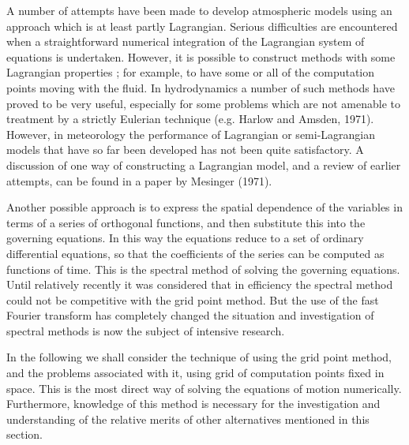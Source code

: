 A number of attempts have been made to develop atmospheric models using an approach which is at least partly Lagrangian. Serious difficulties are encountered when a straightforward numerical integration of the Lagrangian system of equations is undertaken. However, it is possible to construct methods with some Lagrangian properties ; for example, to have some or all of the compu­tation points moving with the fluid. In hydrodynamics a number of such methods have proved to be very useful, especially for some problems which are not amenable to treatment by a strictly Eulerian technique (e.g. Harlow and Amsden, 1971). However, in meteorology the per­formance of Lagrangian or semi-Lagrangian models that have so far been developed has not been quite satis­factory. A discussion of one way of constructing a Lagrangian model, and a review of earlier attempts, can be found in a paper by Mesinger (1971).

Another possible approach is to express the spatial dependence of the variables in terms of a series of ortho­gonal functions, and then substitute this into the governing equations. In this way the equations reduce to a set of ordinary differential equations, so that the coefficients of the series can be computed as functions of time. This is the spectral method of solving the governing equations. Until relatively recently it was considered that in effi­ciency the spectral method could not be competitive with the grid point method. But the use of the fast Fourier transform has completely changed the situation and investigation of spectral methods is now the subject of intensive research.

In the following we shall consider the technique of using the grid point method, and the problems associated with it, using grid of computation points fixed in space. This is the most direct way of solving the equations of motion numerically. Furthermore, knowledge of this method is necessary for the investigation and understanding of the relative merits of other alternatives mentioned in this section.
